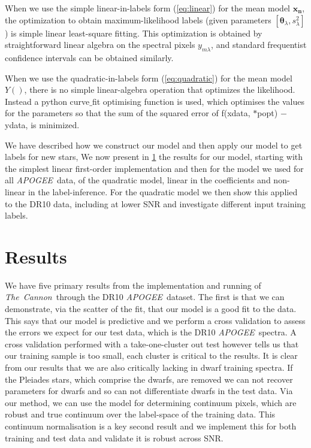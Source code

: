 \documentclass[12pt, preprint]{aastex}
\newcommand{\set}[1]{\bm{#1}}
\newcommand{\tc}{\textsl{The~Cannon}}
\newcommand{\apogee}{\textsl{APOGEE}}
\begin{document}
When we use the simple linear-in-labels form (\ref{eq:linear}) for the
mean model $\set{x_n}$, the optimization to obtain maximum-likelihood labels
(given parameters $[\set{\theta}_\lambda, s_\lambda^2]$) is simple linear
least-square fitting.
This optimization is obtained by straightforward linear algebra on the
spectral pixels $y_{m\lambda}$, and standard frequentist confidence
intervals can be obtained similarly.

When we use the quadratic-in-labels form (\ref{eq:quadratic}) for the
mean model $Y()$, there is no simple linear-algebra operation that
optimizes the likelihood. Instead a python curve$\_$fit optimising function is used, which optimises the values for the parameters so that the sum of the squared error of f(xdata, $*$popt) $-$ ydata,  is minimized. 

We have described how we construct our model and then apply our model to get labels for new stars, We now present in \ref{sec:results} the results for our model, starting with the simplest linear first-order implementation and then for the model we used for all \apogee\ data, of the quadratic model, linear in the coefficients and non-linear in the label-inference.  For the quadratic model we then show this applied to the DR10 data, including at lower SNR and investigate different input training labels. 



\section{Results}
\label{sec:results}

We have five primary results from the implementation and running of \tc\ through the DR10 \apogee\ dataset. The first is that we can demonstrate, via the scatter of the fit, that our model is a good fit to the data. This says that our model is predictive and we perform a cross validation to assess the errors we expect for our test data, which is the DR10 \apogee\ spectra. A cross validation performed with a take-one-cluster out test however tells us that our training sample is too small, each cluster is critical to the results. It is clear from our results that we are also critically lacking in dwarf training spectra. If the Pleiades stars, which comprise the dwarfs, are removed we can not recover parameters for dwarfs and so can not differentiate dwarfs in the test data.
Via our method, we can use the model for determining continuum pixels, which are robust and true continuum over the label-space of the training data. This continuum normalisation is a key second result and we implement this for both training and test data and validate it is robust across SNR. 
\end{document}
